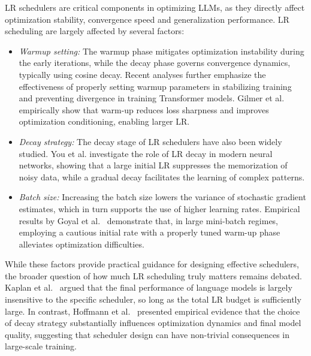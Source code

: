{LR schedulers are critical components in optimizing LLMs, as they directly affect optimization stability, convergence speed and generalization performance. 
LR scheduling are largely affected by several factors:
\begin{itemize}[leftmargin=*]
    \item \textit{Warmup setting:} The warmup phase mitigates optimization instability during the early iterations, while the decay phase governs convergence dynamics, typically using cosine decay. Recent analyses \cite{kalra2024warmup} further emphasize the effectiveness of properly setting warmup parameters in stabilizing training and preventing divergence in training Transformer models. Gilmer et al. \cite{gilmer2022loss} empirically show that warm-up reduces loss sharpness and improves optimization conditioning, enabling larger LR.
    \item \textit{Decay strategy:} The decay stage of LR schedulers have also been widely studied. You et al. \cite{you1908does} investigate the role of LR decay in modern neural networks, showing that a large initial LR suppresses the memorization of noisy data, while a gradual decay facilitates the learning of complex patterns.
    \item \textit{Batch size:} Increasing the batch size lowers the variance of stochastic gradient estimates, which in turn supports the use of higher learning rates. Empirical results by Goyal et al.~\cite{goyal2017accurate} demonstrate that, in large mini-batch regimes, employing a cautious initial rate with a properly tuned warm-up phase alleviates optimization difficulties.
\end{itemize}
While these factors provide practical guidance for designing effective schedulers, the broader question of how much LR scheduling truly matters remains debated. Kaplan et al.~\cite{kaplan2020scaling} argued that the final performance of language models is largely insensitive to the specific scheduler, so long as the total LR budget is sufficiently large. In contrast, Hoffmann et al.~\cite{hoffmann2022training} presented empirical evidence that the choice of decay strategy substantially influences optimization dynamics and final model quality, suggesting that scheduler design can have non-trivial consequences in large-scale training.}

